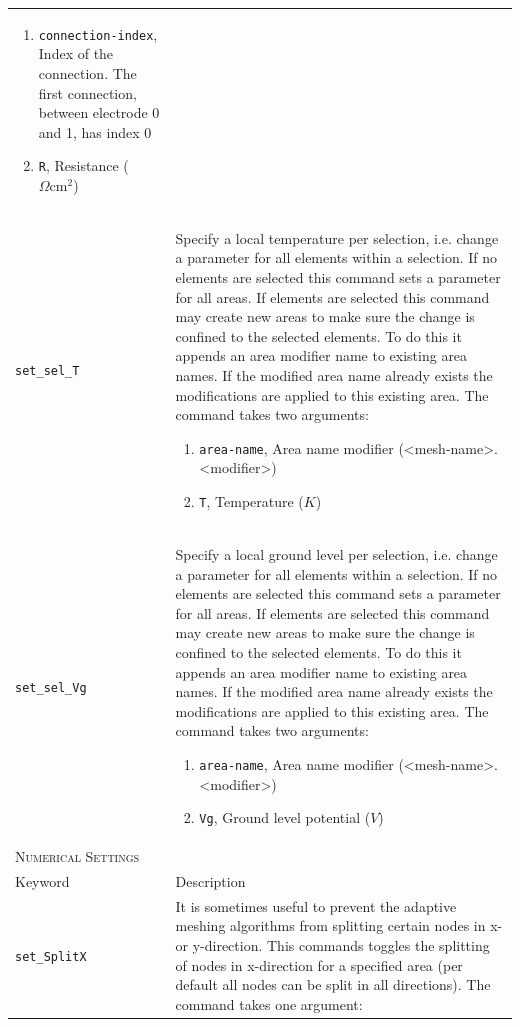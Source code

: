 \documentclass[noshowpacs,preprintnumbers,amsmath,amssymb, letter]{revtex4}
\begin{document}
\begin{longtable}{p{}p{}}
\begin{enumerate}
\item \texttt{connection-index}, Index of the connection. The first connection, between electrode 0 and 1,  has index 0
\item \texttt{R}, Resistance ($\Omega \text{cm}^2$)
\end{enumerate}\\
\texttt{set\_sel\_T}	&  Specify a local temperature per selection, i.e. change a parameter for all elements within a selection. If no elements are selected this command sets a parameter for all areas. If elements are selected this command may create new areas to make sure the change is confined to the selected elements. To do this it appends an area modifier name to existing area names. If the modified area name already exists the modifications are applied to this existing area. The command takes two arguments:
\begin{enumerate}
\item \texttt{area-name}, Area name modifier (\textless mesh-name\textgreater .\textless modifier\textgreater )
\item \texttt{T}, Temperature ($K$)
\end{enumerate}\\
\texttt{set\_sel\_Vg}	&  Specify a local ground level per selection, i.e. change a parameter for all elements within a selection. If no elements are selected this command sets a parameter for all areas. If elements are selected this command may create new areas to make sure the change is confined to the selected elements. To do this it appends an area modifier name to existing area names. If the modified area name already exists the modifications are applied to this existing area. The command takes two arguments:
\begin{enumerate}
\item \texttt{area-name}, Area name modifier (\textless mesh-name\textgreater .\textless modifier\textgreater )
\item \texttt{Vg}, Ground level potential ($V$)
\end{enumerate}\\
\multicolumn{2}{l}{\textsc{Numerical Settings}} \\*
\hline
Keyword & Description \\
\texttt{set\_SplitX}	&  It is sometimes useful to prevent the adaptive meshing algorithms from splitting certain nodes in x- or y-direction. This commands toggles the splitting of nodes in x-direction for a specified area (per default all nodes can be split in all directions). The command takes one argument:

\end{longtable}
\end{document}
